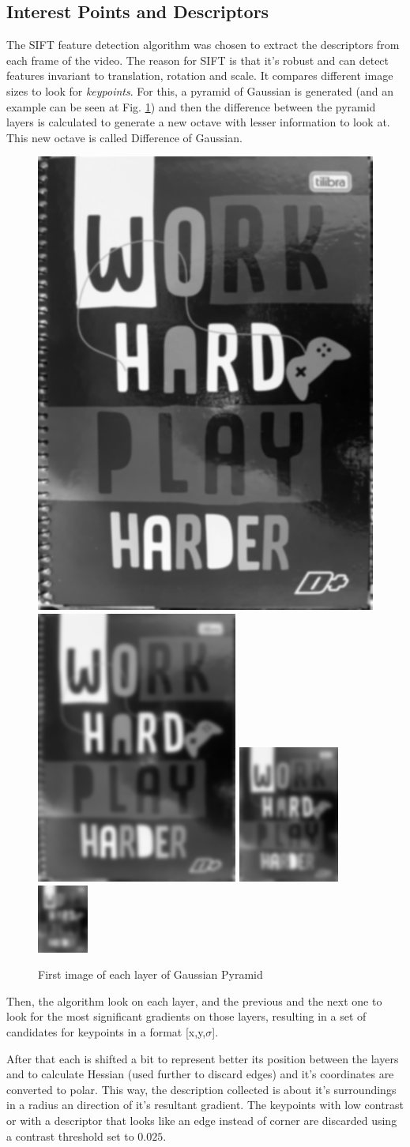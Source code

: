 \documentclass[]{IEEEtran}
\begin{document}
\subsection{Interest Points and Descriptors}

 The SIFT feature detection algorithm was chosen to extract the descriptors from each frame of the video. The reason for SIFT is that it's robust and can detect features invariant to translation, rotation and scale. It compares different image sizes to look for \textit{keypoints}. For this, a pyramid of Gaussian is generated (and an example can be seen at Fig. \ref{fig:gp}) and then the difference between the pyramid layers is calculated to generate a new octave with lesser information to look at. This new octave is called Difference of Gaussian.
 
 \begin{figure}[H]
     \centering
     \includegraphics[width=0.2\hsize]{img/o-report-gp-0-0.png}
     \includegraphics[width=0.1\hsize]{img/o-report-gp-9-0.png}
     \includegraphics[width=0.05\hsize]{img/o-report-gp-18-0.png}
     \includegraphics[width=0.025\hsize]{img/o-report-gp-27-0.png}
     \caption{First image of each layer of Gaussian Pyramid}
     \label{fig:gp}
 \end{figure}
 Then, the algorithm look on each layer, and the previous and the next one to look for the most significant gradients on those layers, resulting in a set of candidates for keypoints in a format [x,y,$\sigma$].
 
 After that each is shifted a bit to represent better its position between the layers and to calculate Hessian (used further to discard edges) and it's coordinates are converted to polar. This way, the description collected is about it's surroundings in a radius an direction of it's resultant gradient. The keypoints with low contrast or with a descriptor that looks like an edge instead of corner are discarded using a contrast threshold set to $0.025$.
 
\end{document}
